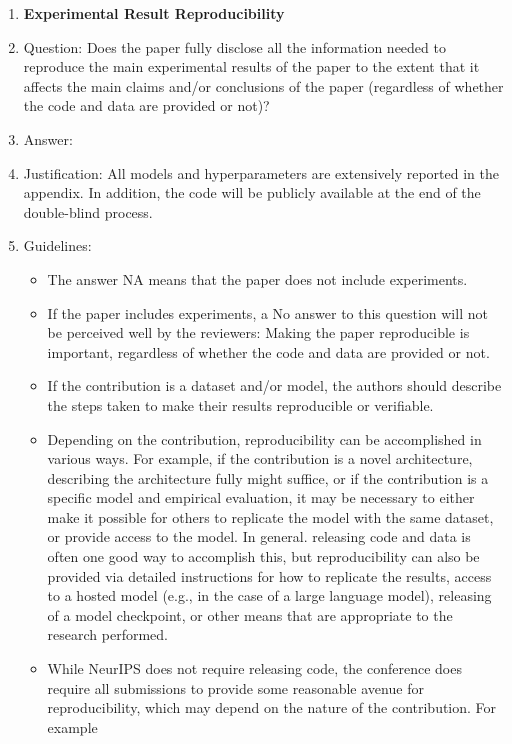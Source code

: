 \documentclass{article}
\begin{document}
\begin{enumerate}
    \item {\bf Experimental Result Reproducibility}
    \item[] Question: Does the paper fully disclose all the information needed to reproduce the main experimental results of the paper to the extent that it affects the main claims and/or conclusions of the paper (regardless of whether the code and data are provided or not)?
    \item[] Answer: \answerYes{} %
    \item[] Justification: All models and hyperparameters are extensively reported in the appendix. In addition, the code will be publicly available at the end of the double-blind process.
    \item[] Guidelines:
    \begin{itemize}
        \item The answer NA means that the paper does not include experiments.
        \item If the paper includes experiments, a No answer to this question will not be perceived well by the reviewers: Making the paper reproducible is important, regardless of whether the code and data are provided or not.
        \item If the contribution is a dataset and/or model, the authors should describe the steps taken to make their results reproducible or verifiable. 
        \item Depending on the contribution, reproducibility can be accomplished in various ways. For example, if the contribution is a novel architecture, describing the architecture fully might suffice, or if the contribution is a specific model and empirical evaluation, it may be necessary to either make it possible for others to replicate the model with the same dataset, or provide access to the model. In general. releasing code and data is often one good way to accomplish this, but reproducibility can also be provided via detailed instructions for how to replicate the results, access to a hosted model (e.g., in the case of a large language model), releasing of a model checkpoint, or other means that are appropriate to the research performed.
        \item While NeurIPS does not require releasing code, the conference does require all submissions to provide some reasonable avenue for reproducibility, which may depend on the nature of the contribution. For example
        \begin{enumerate}

\end{enumerate}
\end{itemize}
\end{enumerate}
\end{document}
